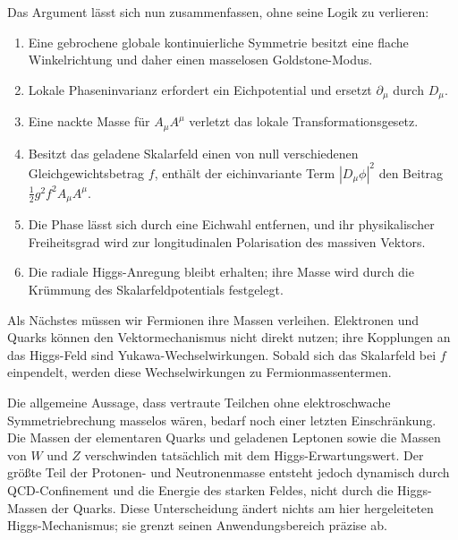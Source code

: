 Das Argument lässt sich nun zusammenfassen, ohne seine Logik zu verlieren:
\begin{enumerate}
  \item Eine gebrochene globale kontinuierliche Symmetrie besitzt eine flache Winkelrichtung und daher einen masselosen Goldstone-Modus.
  \item Lokale Phaseninvarianz erfordert ein Eichpotential und ersetzt \(\partial_\mu\) durch \(D_\mu\).
  \item Eine nackte Masse für \(A_\mu A^\mu\) verletzt das lokale Transformationsgesetz.
  \item Besitzt das geladene Skalarfeld einen von null verschiedenen Gleichgewichtsbetrag \(f\), enthält der eichinvariante Term \(|D_\mu\phi|^2\) den Beitrag \(\frac12g^2f^2A_\mu A^\mu\).
  \item Die Phase lässt sich durch eine Eichwahl entfernen, und ihr physikalischer Freiheitsgrad wird zur longitudinalen Polarisation des massiven Vektors.
  \item Die radiale Higgs-Anregung bleibt erhalten; ihre Masse wird durch die Krümmung des Skalarfeldpotentials festgelegt.
\end{enumerate}

Als Nächstes müssen wir Fermionen ihre Massen verleihen. Elektronen und Quarks können den Vektormechanismus nicht direkt nutzen; ihre Kopplungen an das Higgs-Feld sind Yukawa-Wechselwirkungen. Sobald sich das Skalarfeld bei \(f\) einpendelt, werden diese Wechselwirkungen zu Fermionmassentermen.

Die allgemeine Aussage, dass vertraute Teilchen ohne elektroschwache Symmetriebrechung masselos wären, bedarf noch einer letzten Einschränkung. Die Massen der elementaren Quarks und geladenen Leptonen sowie die Massen von \(W\) und \(Z\) verschwinden tatsächlich mit dem Higgs-Erwartungswert. Der größte Teil der Protonen- und Neutronenmasse entsteht jedoch dynamisch durch QCD-Confinement und die Energie des starken Feldes, nicht durch die Higgs-Massen der Quarks. Diese Unterscheidung ändert nichts am hier hergeleiteten Higgs-Mechanismus; sie grenzt seinen Anwendungsbereich präzise ab.
